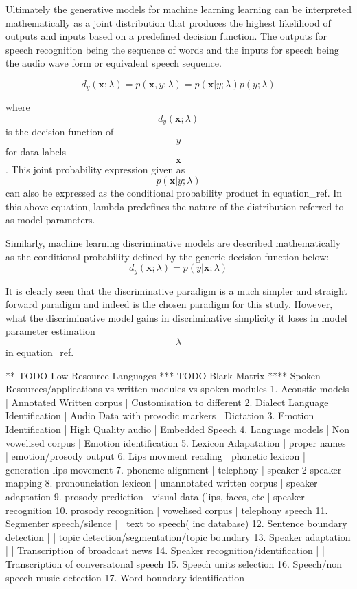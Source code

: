 Ultimately the generative models for machine learning learning can be interpreted mathematically as a joint distribution that produces the highest likelihood of outputs and inputs based on a predefined decision function.  The outputs for speech recognition being the sequence of words and the inputs for speech being the audio wave form or equivalent speech sequence.

$$d_y(\mathbf{x};\lambda)=p(\mathbf{x},y;\lambda)=p(\mathbf{x}|y;\lambda)p(y;\lambda)$$

where $$d_y(\mathbf{x};\lambda)$$ is the decision function of $$y$$ for data labels $$\mathbf{x}$$.  This joint probability expression given as $$p(\mathbf{x}|y;\lambda)$$ can also be expressed as the conditional probability product in equation_ref.  In this above equation, lambda predefines the nature of the distribution \cite{2013Deng***} referred to as model parameters.

Similarly, machine learning discriminative models are described mathematically as the conditional probability defined by the generic decision function below:
$$d_y(\mathbf{x};\lambda)=p(y|\mathbf{x};\lambda)$$

It is clearly seen that the discriminative paradigm is a much simpler and straight forward paradigm and indeed is the chosen paradigm for this study.  However, what the discriminative model gains in discriminative simplicity it loses in model parameter estimation $$\lambda$$ in equation_ref.

** TODO Low Resource Languages
*** TODO Blark Matrix
**** Spoken Resources/applications vs written modules vs spoken modules
1. Acoustic models | Annotated Written corpus | Customisation to different 
2. Dialect Language Identification | Audio Data with prosodic markers | Dictation
3. Emotion Identification | High Quality audio | Embedded Speech
4. Language models | Non vowelised corpus | Emotion identification
5. Lexicon Adapatation | proper names | emotion/prosody output
6. Lips movment reading | phonetic lexicon | generation lips movement
7. phoneme alignment | telephony | speaker 2 speaker mapping
8. pronounciation lexicon | unannotated written corpus | speaker adaptation 
9. prosody prediction | visual data (lips, faces, etc | speaker recognition
10. prosody recognition | vowelised corpus | telephony speech 
11. Segmenter speech/silence | | text to speech( inc database) 
12. Sentence boundary detection | | topic detection/segmentation/topic boundary
13. Speaker adaptation | | Transcription of broadcast news
14. Speaker recognition/identification | | Transcription of conversatonal speech
15. Speech units selection 
16. Speech/non speech music detection
17. Word boundary identification


